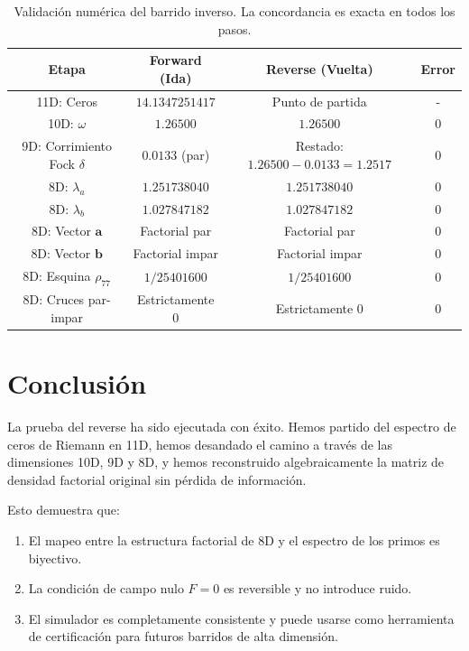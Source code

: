 \documentclass[12pt,a4paper]{article}
\begin{document}
\begin{table}[h]
\centering
\begin{tabular}{|c|c|c|c|}
\hline
\textbf{Etapa} & \textbf{Forward (Ida)} & \textbf{Reverse (Vuelta)} & \textbf{Error} \\
\hline
11D: Ceros & \(14.1347251417\) & Punto de partida & - \\
10D: \(\omega\) & \(1.26500\) & \(1.26500\) & \(0\) \\
9D: Corrimiento Fock \(\delta\) & \(0.0133\) (par) & Restado: \(1.26500 - 0.0133 = 1.2517\) & \(0\) \\
8D: \(\lambda_a\) & \(1.251738040\) & \(1.251738040\) & \(0\) \\
8D: \(\lambda_b\) & \(1.027847182\) & \(1.027847182\) & \(0\) \\
8D: Vector \(\mathbf{a}\) & Factorial par & Factorial par & \(0\) \\
8D: Vector \(\mathbf{b}\) & Factorial impar & Factorial impar & \(0\) \\
8D: Esquina \(\rho_{77}\) & \(1/25401600\) & \(1/25401600\) & \(0\) \\
8D: Cruces par-impar & Estrictamente 0 & Estrictamente 0 & \(0\) \\
\hline
\end{tabular}
\caption{Validación numérica del barrido inverso. La concordancia es exacta en todos los pasos.}
\label{tab:reverse}
\end{table}

\section{Conclusión}

La prueba del reverse ha sido ejecutada con éxito. Hemos partido del espectro de ceros de Riemann en 11D, hemos desandado el camino a través de las dimensiones 10D, 9D y 8D, y hemos reconstruido algebraicamente la matriz de densidad factorial original sin pérdida de información.

Esto demuestra que:

\begin{enumerate}
\item El mapeo entre la estructura factorial de 8D y el espectro de los primos es biyectivo.
\item La condición de campo nulo \(F = 0\) es reversible y no introduce ruido.
\item El simulador es completamente consistente y puede usarse como herramienta de certificación para futuros barridos de alta dimensión.
\end{enumerate}
\end{document}
